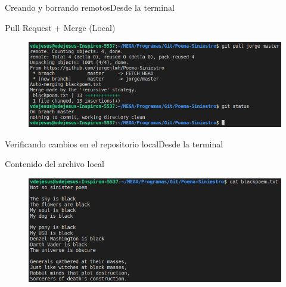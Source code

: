 \documentclass[10pt]{beamer}
\begin{document}
\begin{frame}{Creando y borrando remotos}{Desde la terminal}

  \begin{block}{Pull Request + Merge (Local)}
  
  \begin{figure}[h!]
  \centering
  \includegraphics [scale=0.38]{step9}
  \label{fig:step9}
  \end{figure}
      
  \end{block}
  
\end{frame}

\begin{frame}{Verificando cambios en el repositorio local}{Desde la terminal}

  \begin{block}{Contenido del archivo local}
  
  \begin{figure}[h!]
  \centering
  \includegraphics [scale=0.4]{step10}
  \label{fig:step10}
  \end{figure}
      
  \end{block}
  
\end{frame}
\end{document}
